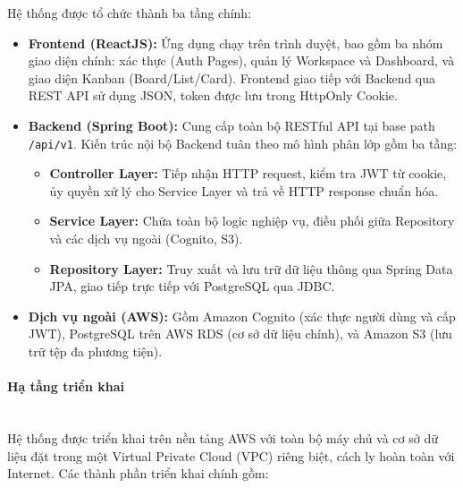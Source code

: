 Hệ thống được tổ chức thành ba tầng chính:

\begin{itemize}
    \item \textbf{Frontend (ReactJS):} Ứng dụng chạy trên trình duyệt, bao gồm ba nhóm giao diện chính: xác thực (Auth Pages), quản lý Workspace và Dashboard, và giao diện Kanban (Board/List/Card). Frontend giao tiếp với Backend qua REST API sử dụng JSON, token được lưu trong HttpOnly Cookie.

    \item \textbf{Backend (Spring Boot):} Cung cấp toàn bộ RESTful API tại base path \texttt{/api/v1}. Kiến trúc nội bộ Backend tuân theo mô hình phân lớp gồm ba tầng:
    \begin{itemize}
        \item \textbf{Controller Layer:} Tiếp nhận HTTP request, kiểm tra JWT từ cookie, ủy quyền xử lý cho Service Layer và trả về HTTP response chuẩn hóa.
        \item \textbf{Service Layer:} Chứa toàn bộ logic nghiệp vụ, điều phối giữa Repository và các dịch vụ ngoài (Cognito, S3).
        \item \textbf{Repository Layer:} Truy xuất và lưu trữ dữ liệu thông qua Spring Data JPA, giao tiếp trực tiếp với PostgreSQL qua JDBC.
    \end{itemize}

    \item \textbf{Dịch vụ ngoài (AWS):} Gồm Amazon Cognito (xác thực người dùng và cấp JWT), PostgreSQL trên AWS RDS (cơ sở dữ liệu chính), và Amazon S3 (lưu trữ tệp đa phương tiện).
\end{itemize}

\paragraph{Hạ tầng triển khai} \mbox{}\\

Hệ thống được triển khai trên nền tảng AWS với toàn bộ máy chủ và cơ sở dữ liệu đặt trong một Virtual Private Cloud (VPC) riêng biệt, cách ly hoàn toàn với Internet. Các thành phần triển khai chính gồm:

